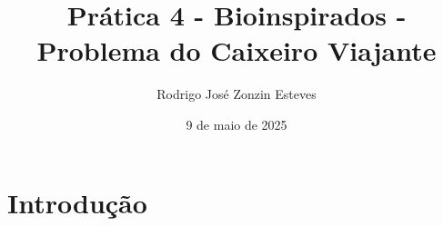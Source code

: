 \documentclass[12pt]{article}
\title{Prática 4 - Bioinspirados - Problema do Caixeiro Viajante}
\author{Rodrigo José Zonzin Esteves}
\date{9 de maio de 2025}
\begin{document}
\maketitle

\section{Introdução}
\end{document}
